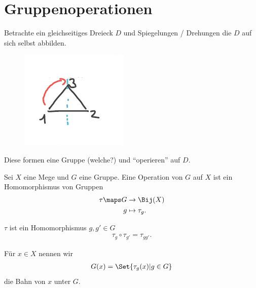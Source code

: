 \section*{Gruppenoperationen}
\begin{beispiel}\label{d_3}
    Betrachte ein gleichseitiges Dreieck \( D \) und Spiegelungen / Drehungen die \( D \) auf sich selbst abbilden.

    \begin{figure}[H]
        \centering
        \includegraphics[width=0.2\linewidth]{figures/d_3}
        \label{fig:d_3}
    \end{figure}
    Diese formen eine Gruppe (welche?) und \enquote{operieren} auf \( D \).
\end{beispiel}
\begin{definition}
    Sei \( X \) eine Mege und \( G \) eine Gruppe. 
    Eine Operation von \( G \) auf \( X \) ist ein Homomorphismus von Gruppen
    \begin{align*}
        \tau\maps \begin{aligned}[t] 
            G&\to \Bij(X)\\
            g&\mapsto \tau_g.
        \end{aligned}
    \end{align*}
\end{definition}
\begin{bemerkung*}
    \( \tau \) ist ein Homomorphismus \dh \tforall \( g, g' \in G \)
    \begin{align*}
        \tau_g\circ \tau_{g'}=\tau_{gg'}.
    \end{align*}
    
    Für \( x\in X \) nennen wir
    \begin{align*}
        G(x)=\Set{\tau_g(x)|g\in G}
    \end{align*}
    die Bahn von \( x \) unter \( G \).
\end{bemerkung*}
